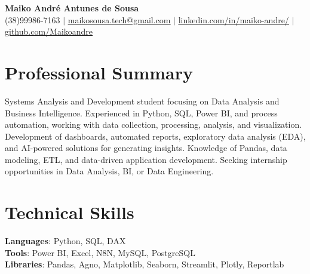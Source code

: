 \documentclass[letterpaper,11pt]{article}
\begin{document}

\begin{center}
    \textbf{\Huge Maiko André Antunes de Sousa} \\ \vspace{1pt}
    \small (38)99986-7163 $|$ \href{mailto:x@x.com}{\underline{maikosousa.tech@gmail.com}} $|$ %
    \href{https://www.linkedin.com/in/maiko-andre/}{\underline{linkedin.com/in/maiko-andre/}} $|$
    \href{https://github.com/Maikoandre}{\underline{github.com/Maikoandre}}
\end{center}

\section{Professional Summary}
  \textbf{}{Systems Analysis and Development student focusing on Data Analysis and Business Intelligence. 
  Experienced in Python, SQL, Power BI, and process automation, working with data collection, processing, analysis, and visualization. 
  Development of dashboards, automated reports, exploratory data analysis (EDA), and AI-powered solutions for generating insights. 
  Knowledge of Pandas, data modeling, ETL, and data-driven application development. 
  Seeking internship opportunities in Data Analysis, BI, or Data Engineering.
}

\section{Technical Skills}
 \begin{itemize}[leftmargin=0.15in, label={}]
    \small{\item{
     \textbf{Languages}{: Python, SQL, DAX} \\
     \textbf{Tools}{: Power BI, Excel, N8N, MySQL, PostgreSQL} \\
     \textbf{Libraries}{: Pandas, Agno, Matplotlib, Seaborn, Streamlit, Plotly, Reportlab}
    }}
 \end{itemize}
\end{document}
